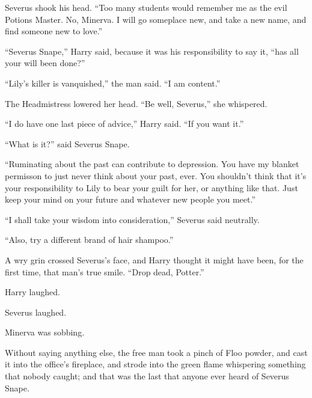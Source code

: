 Severus shook his head. ``Too many students would remember me as the evil Potions Master. No, Minerva. I will go someplace new, and take a new name, and find someone new to love.''

``Severus Snape,'' Harry said, because it was his responsibility to say it, ``has all your will been done?''

``Lily's killer is vanquished,'' the man said. ``I am content.''

The Headmistress lowered her head. ``Be well, Severus,'' she whispered.

``I do have one last piece of advice,'' Harry said. ``If you want it.''

``What is it?'' said Severus Snape.

``Ruminating about the past can contribute to depression. You have my blanket permisson to just never think about your past, ever. You shouldn't think that it's your responsibility to Lily to bear your guilt for her, or anything like that. Just keep your mind on your future and whatever new people you meet.''

``I shall take your wisdom into consideration,'' Severus said neutrally.

``Also, try a different brand of hair shampoo.''

A wry grin crossed Severus's face, and Harry thought it might have been, for the first time, that man's true smile. ``Drop dead, Potter.''

Harry laughed.

Severus laughed.

Minerva was sobbing.

Without saying anything else, the free man took a pinch of Floo powder, and cast it into the office's fireplace, and strode into the green flame whispering something that nobody caught; and that was the last that anyone ever heard of Severus Snape.
